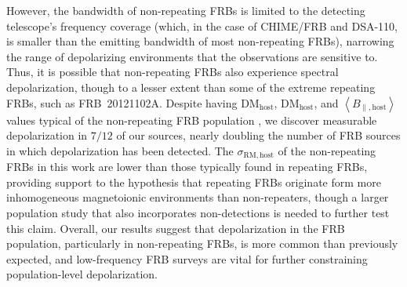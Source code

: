 \documentclass[twocolumn, linenumbers]{aastex701}
\begin{document}
However, the bandwidth of non-repeating FRBs is limited to the detecting telescope's frequency coverage (which, in the case of CHIME/FRB and DSA-110, is smaller than the emitting bandwidth of most non-repeating FRBs), narrowing the range of depolarizing environments that the observations are sensitive to. Thus, it is possible that non-repeating FRBs also experience spectral depolarization, though to a lesser extent than some of the extreme repeating FRBs, such as FRB~20121102A. Despite having $\mathrm{DM}_\mathrm{host}$, $\mathrm{DM}_\mathrm{host}$, and $\left<B_{\parallel,\mathrm{host}}\right>$ values typical of the non-repeating FRB population \citep{2024ApJ...968...50P, 2024ApJ...964..131S}, we discover measurable depolarization in $7/12$ of our sources, nearly doubling the number of FRB sources in which depolarization has been detected. The $\sigma_\mathrm{RM,host}$ of the non-repeating FRBs in this work are lower than those typically found in repeating FRBs, providing support to the hypothesis that repeating FRBs originate form more inhomogeneous magnetoionic environments than non-repeaters, though a larger population study that also incorporates non-detections is needed to further test this claim. Overall, our results suggest that depolarization in the FRB population, particularly in non-repeating FRBs, is more common than previously expected, and low-frequency FRB surveys are vital for further constraining population-level depolarization.
\end{document}

